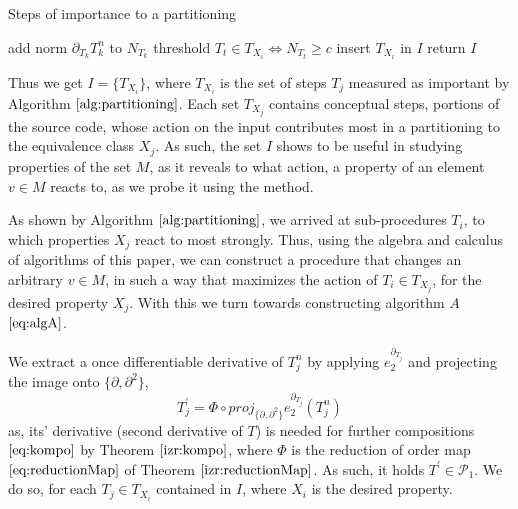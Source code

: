 \documentclass{article}
\newcommand{\dP}{\mathcal{P}}
\newcommand{\D}{\partial}
\begin{document}
  
\begin{algorithm}[h]
\caption{Steps of importance to a partitioning}
\label{alg:partitioning}
\begin{algorithmic}[1]
\State add norm $\D_{T_k}T^n_k$ to $N_{T_k}$
\EndFor
\EndFor
\State threshold $T_t\in T_{X_i}\iff N_{T_t}\ge c$  
\State insert $T_{X_i}$ in $I$
\EndFor
\State return $I$
\EndProcedure
\end{algorithmic}
\end{algorithm}
Thus we get $I=\{T_{X_i}\}$, where $T_{X_i}$ is the set of steps $T_j$ measured as important by Algorithm $\ref{alg:partitioning}$. Each set $T_{X_j}$ contains conceptual steps, portions of the source code, whose action on the input contributes most in a partitioning to the equivalence class $X_j$. As such, the set $I$ shows to be useful in studying properties of the set $M$, as it reveals to what action, a property of an element $v\in M$ reacts to, as we probe it using the method.

As shown by Algorithm $\ref{alg:partitioning}$, we arrived at sub-procedures $T_i$, to which properties $X_j$ react to most strongly. Thus, using the algebra and calculus of algorithms of this paper, we can construct a procedure that changes an arbitrary $v\in M$, in such a way that maximizes the action of $T_i\in T_{X_j}$, for the desired property $X_j$. With this we turn towards constructing algorithm $A$ $\eqref{eq:algA}$.

We extract a once differentiable derivative of $T^n_j$ by applying $e^{\D_{T_j}}_2$ and projecting the image onto $\{\D,\D^2\}$,
\begin{equation}\label{eq:T'}
T^\prime_j=\Phi\circ proj_{\{\D,\D^2\}}e^{\D_{T_j}}_2(T^n_j)
\end{equation}
as, its' derivative (second derivative of $T$) is needed for further compositions $\eqref{eq:kompo}$ by Theorem $\ref{izr:kompo}$, where $\Phi$ is the reduction of order map $\eqref{eq:reductionMap}$ of Theorem $\ref{izr:reductionMap}$. As such, it holds $T^\prime\in\dP_1$. We do so, for each $T_j\in T_{X_i}$ contained in $I$, where $X_i$ is the desired property.
\end{document}
